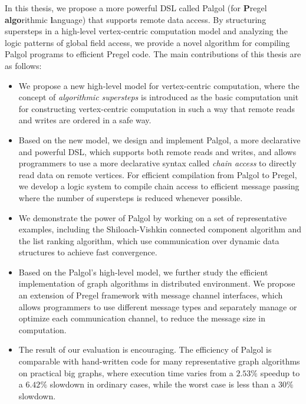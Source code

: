 \documentclass{sokendai_thesis} %
\begin{document}
In this thesis, we propose a more powerful DSL called Palgol (for {\bf P}regel {\bf algo}rithmic {\bf l}anguage) that supports remote data access.
By structuring supersteps in a high-level vertex-centric computation model and analyzing the logic patterns of global field access, we provide a novel algorithm for compiling Palgol programs to efficient Pregel code. 
The main contributions of this thesis are as follows:
\begin{itemize}\setlength\itemsep{0em}
 \item
  We propose a new high-level model for vertex-centric computation, where the concept of \emph{algorithmic supersteps} is introduced as the basic computation unit for constructing vertex-centric computation in such a way that remote reads and writes are ordered in a safe way.

 \item
  Based on the new model, we design and implement Palgol, a more declarative and powerful DSL, which supports both remote reads and writes, and allows programmers to use a more declarative syntax called \emph{chain access} to directly read data on remote vertices.
  For efficient compilation from Palgol to Pregel, we develop a logic system to compile chain access to efficient message passing where the number of supersteps is reduced whenever possible. %

 \item
  We demonstrate the power of Palgol by working on a set of representative examples, including the Shiloach-Vishkin connected component algorithm and the list ranking algorithm, which use communication over dynamic data structures to achieve fast convergence.

 \item
  Based on the Palgol's high-level model, we further study the efficient implementation of graph algorithms in distributed environment.
  We propose an extension of Pregel framework with message channel interfaces, which allows programmers to use different message types and separately manage or optimize each communication channel, to reduce the message size in computation.

 \item
  The result of our evaluation is encouraging.
  The efficiency of Palgol is comparable with hand-written code for many representative graph algorithms on practical big graphs, where execution time varies from a $2.53\%$ speedup to a $6.42\%$ slowdown in ordinary cases, while the worst case is less than a $30\%$ slowdown.

\end{itemize}
\end{document}
